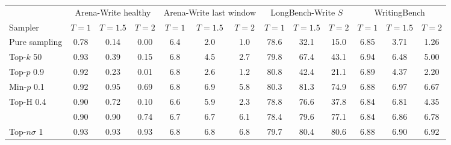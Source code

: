 \begin{tabular}{lcccccccccccc}
\toprule
 & \multicolumn{3}{c}{Arena-Write healthy} & \multicolumn{3}{c}{Arena-Write last window} & \multicolumn{3}{c}{LongBench-Write $S$} & \multicolumn{3}{c}{WritingBench} \\
\cmidrule(lr){2-4} \cmidrule(lr){5-7} \cmidrule(lr){8-10} \cmidrule(lr){11-13}
Sampler & $T{=}1$ & $T{=}1.5$ & $T{=}2$ & $T{=}1$ & $T{=}1.5$ & $T{=}2$ & $T{=}1$ & $T{=}1.5$ & $T{=}2$ & $T{=}1$ & $T{=}1.5$ & $T{=}2$ \\
\midrule
Pure sampling & 0.78 & 0.14 & 0.00 & 6.4 & 2.0 & 1.0 & 78.6 & 32.1 & 15.0 & 6.85 & 3.71 & 1.26 \\
Top-$k$ 50 & 0.93 & 0.39 & 0.15 & 6.8 & 4.5 & 2.7 & 79.8 & 67.4 & 43.1 & 6.94 & 6.48 & 5.00 \\
Top-$p$ 0.9 & 0.92 & 0.23 & 0.01 & 6.8 & 2.6 & 1.2 & 80.8 & 42.4 & 21.1 & 6.89 & 4.37 & 2.20 \\
Min-$p$ 0.1 & 0.92 & 0.95 & 0.69 & 6.8 & 6.9 & 5.8 & 80.3 & 81.3 & 74.9 & 6.88 & 6.97 & 6.67 \\
Top-H 0.4 & 0.90 & 0.72 & 0.10 & 6.6 & 5.9 & 2.3 & 78.8 & 76.6 & 37.8 & 6.84 & 6.81 & 4.35 \\
\pless{} & 0.90 & 0.90 & 0.74 & 6.7 & 6.7 & 6.1 & 78.4 & 79.6 & 77.1 & 6.84 & 6.86 & 6.78 \\
Top-$n\sigma$ 1 & 0.93 & 0.93 & 0.93 & 6.8 & 6.8 & 6.8 & 79.7 & 80.4 & 80.6 & 6.88 & 6.90 & 6.92 \\
\bottomrule
\end{tabular}
